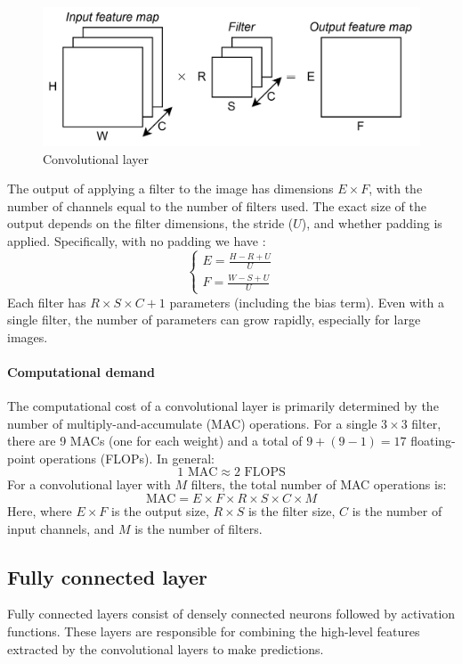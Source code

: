 \begin{figure}[H]
    \centering
    \includegraphics[width=0.5\linewidth]{images/eeai7.png}
    \caption{Convolutional layer}
\end{figure}

The output of applying a filter to the image has dimensions $E\times F$, with the number of channels equal to the number of filters used. 
The exact size of the output depends on the filter dimensions, the stride ($U$), and whether padding is applied. 
Specifically, with no padding we have :
\[\begin{cases}
    E=\frac{H-R+U}{U} \\
    F=\frac{W-S+U}{U}
\end{cases}\]
\noindent Each filter has $R\times S \times C+1$ parameters (including the bias term). 
Even with a single filter, the number of parameters can grow rapidly, especially for large images.

\paragraph*{Computational demand}
The computational cost of a convolutional layer is primarily determined by the number of multiply-and-accumulate (MAC) operations.
For a single $3\times 3$ filter, there are 9 MACs (one for each weight) and a total of $9+(9-1)=17$ floating-point operations (FLOPs). 
In general:
\[1\text{ MAC}\approx 2\text{ FLOPS}\]
For a convolutional layer with $M$ filters, the total number of MAC operations is:
\[\text{MAC}=E\times F\times R\times S\times C\times M\]
\noindent Here, where $E\times F$ is the output size, $R\times S$ is the filter size, $C$ is the number of input channels, and $M$ is the number of filters.

\subsection{Fully connected layer}
Fully connected layers consist of densely connected neurons followed by activation functions. 
These layers are responsible for combining the high-level features extracted by the convolutional layers to make predictions.

